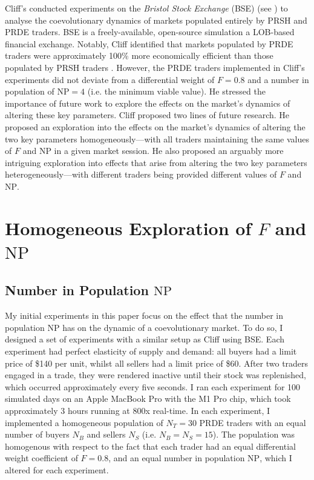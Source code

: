 \documentclass[conference]{IEEEtran}
\begin{document}
Cliff's conducted experiments on the \textit{Bristol Stock Exchange} (BSE) (see \cite{BSE, BSEPaper}) to analyse the coevolutionary dynamics of markets populated entirely by PRSH and PRDE traders.
BSE is a freely-available, open-source simulation a LOB-based financial exchange.
Notably, Cliff identified that markets populated by PRDE traders were approximately 100\% more economically efficient than those populated by PRSH traders \cite{PRDE}.
However, the PRDE traders implemented in Cliff's experiments did not deviate from a differential weight of $F=0.8$ and a number in population of $\mathrm{NP}=4$ (i.e. the minimum viable value).
He stressed the importance of future work to explore the effects on the market's dynamics of altering these key parameters.
Cliff proposed two lines of future research.
He proposed an exploration into the effects on the market's dynamics of altering the two key parameters homogeneously---with all traders maintaining the same values of $F$ and $\mathrm{NP}$ in a given market session.
He also proposed an arguably more intriguing exploration into effects that arise from altering the two key parameters heterogeneously---with different traders being provided different values of $F$ and $\mathrm{NP}$.

\section{Homogeneous Exploration of $F$ and $\mathrm{NP}$}

\subsection{Number in Population $\mathrm{NP}$}

My initial experiments in this paper focus on the effect that the number in population $\mathrm{NP}$ has on the dynamic of a coevolutionary market.
To do so, I designed a set of experiments with a similar setup as Cliff \cite{PRDE} using BSE.
Each experiment had perfect elasticity of supply and demand: all buyers had a limit price of \$140 per unit, whilst all sellers had a limit price of \$60.
After two traders engaged in a trade, they were rendered inactive until their stock was replenished, which occurred approximately every five seconds.
I ran each experiment for 100 simulated days on an Apple MacBook Pro with the M1 Pro chip, which took approximately 3 hours running at 800x real-time.
In each experiment, I implemented a homogeneous population of $N_T=30$ PRDE traders with an equal number of buyers $N_B$ and sellers $N_S$ (i.e. $N_B=N_S=15$).
The population was homogenous with respect to the fact that each trader had an equal differential weight coefficient of $F=0.8$, and an equal number in population $\mathrm{NP}$, which I altered for each experiment.
\end{document}
